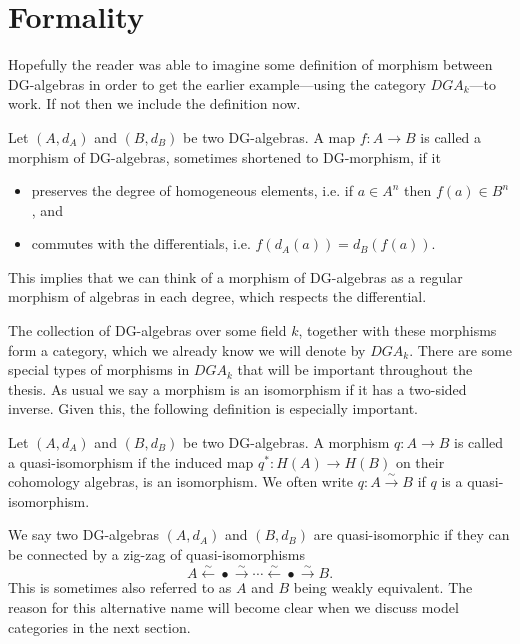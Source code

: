 \section{Formality}
\label{sec:formality}

Hopefully the reader was able to imagine some definition of morphism between DG-algebras in order to get the earlier example---using the category $DGA_k$---to work. If not then we include the definition now. 

\begin{definition}[DG-morphism]
\label{def:dg-morphism}
Let $(A, d_A)$ and $(B, d_B)$ be two DG-algebras. A map $f:A\longrightarrow B$ is called a morphism of DG-algebras, sometimes shortened to DG-morphism, if it
\begin{itemize}
    \item preserves the degree of homogeneous elements, i.e. if $a\in A^n$ then $f(a)\in B^n$, and
    \item commutes with the differentials, i.e. $f(d_A(a))=d_B(f(a))$. 
\end{itemize}
\end{definition}

This implies that we can think of a morphism of DG-algebras as a regular morphism of algebras in each degree, which respects the differential.

The collection of DG-algebras over some field $k$, together with these morphisms form a category, which we already know we will denote by $DGA_k$. There are some special types of morphisms in $DGA_k$ that will be important throughout the thesis. As usual we say a morphism is an isomorphism if it has a two-sided inverse. Given this, the following definition is especially important. 

\begin{definition}
\label{def:quasi-isomorphism}
Let $(A, d_A)$ and $(B, d_B)$ be two DG-algebras. A morphism $q:A\longrightarrow B$ is called a quasi-isomorphism if the induced map $q^*:H(A)\longrightarrow H(B)$ on their cohomology algebras, is an isomorphism. We often write $q:A\overset{\sim}\longrightarrow B$ if $q$ is a quasi-isomorphism. 
\end{definition}

\begin{definition}
\label{def:quasi-isomorphic}
We say two DG-algebras $(A, d_A)$ and $(B, d_B)$ are quasi-isomorphic if they can be connected by a zig-zag of quasi-isomorphisms 
\begin{equation*}
    A \overset{\sim}\longleftarrow \bullet \overset{\sim}\longrightarrow \cdots \overset{\sim}\longleftarrow \bullet \overset{\sim}\longrightarrow B .
\end{equation*}
This is sometimes also referred to as $A$ and $B$ being weakly equivalent. The reason for this alternative name will become clear when we discuss model categories in the next section. 
\end{definition}

